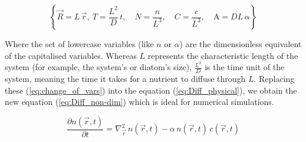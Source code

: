 \begin{equation}
\left\{
    \vec{R} = L \, \vec{r}, \
    T = \frac{L^2}{D} \, t, \quad
    N = \frac{n}{L^3}, \quad
    C = \frac{c}{L^3}, \quad
    \mathrm{A} = DL \, \alpha
\right\}
\label{eq:change_of_vars}
\end{equation}

Where the set of lowercase variables (like \(n\) or \(\alpha\)) are the dimensionless equivalent of the capitalised variables. 
Whereas \(L\) represents the characteristic length of the system (for example, the system's or diatom's size),
\(\frac{L^2}{D}\) is the time unit of the system, meaning the time it takes for a nutrient to diffuse through \(L\). 
Replacing these (\ref{eq:change_of_vars}) into the equation (\ref{eq:Diff_physical}),
we obtain the new equation (\ref{eq:Diff_non-dim}) which is ideal for numerical simulations.

\begin{equation}
    \frac{\partial n (\vec{r}, t)}{\partial t} =
    \nabla^2_{\vec{r}} \, n (\vec{r}, t)
    - \alpha \, n(\vec{r}, t) \, c(\vec{r}, t)
\label{eq:Diff_non-dim}
\end{equation}
